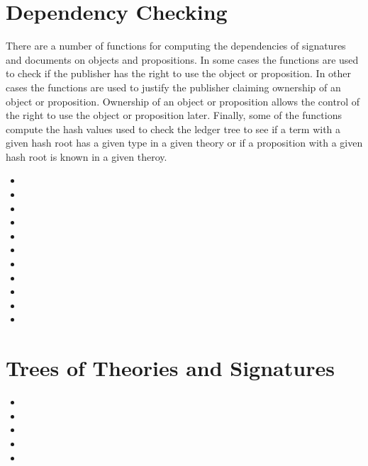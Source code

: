 \section{Dependency Checking}

There are a number of functions for computing the dependencies
of signatures and documents on objects and propositions.
In some cases the functions are used to check if the publisher has the
right to use the object or proposition.
In other cases the functions are used to justify the publisher claiming
ownership of an object or proposition.
Ownership of an object or proposition allows the control of the right to use
the object or proposition later.
Finally, some of the functions compute the hash values used to check the ledger
tree to see if a term with a given hash root has a given type in a given theory
or if a proposition with a given hash root is known in a given theroy.

\begin{itemize}
\item {}
\item {}
\item {}
\item {}
\item {}
\item {}
\item {}
\item {}
\item {}
\item {}
\item {}
\end{itemize}

\section{Trees of Theories and Signatures}

{}
{}

\begin{itemize}
\item {}
\item {}
\item {}
\item {}
\item {}
\end{itemize}

